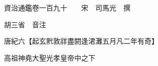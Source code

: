 










 


 
 


 

  
  
  
  
  





  
  
  
  
  
 
  

  

  
  
  



  

 
 

  
   




  

  
  


  　　資治通鑑卷一百九十　　宋　司馬光　撰

　　胡三省　音注

　　唐紀六【起玄黓敦牂盡閼逢涒灘五月凡二年有奇】

　　高祖神堯大聖光孝皇帝中之下

